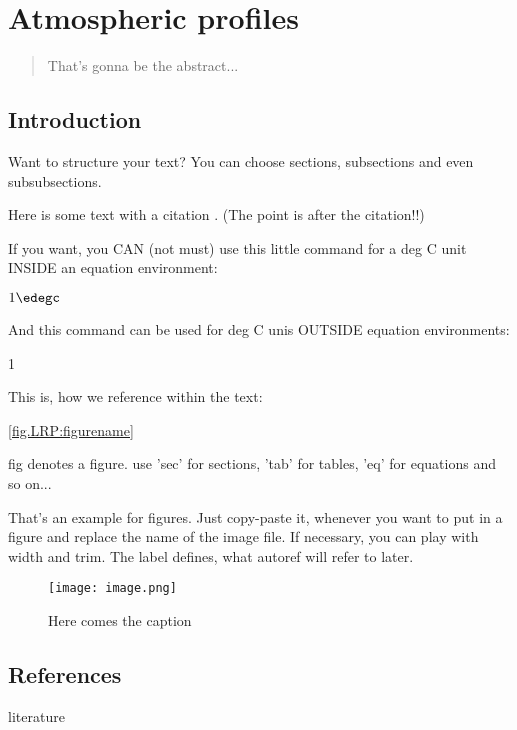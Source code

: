 

\renewcommand{\chapterauthor}{Again Your Name}
\chapter{Atmospheric profiles}
\label{student1:report}

\begin{abstract}

That's gonna be the abstract...

\end{abstract}


\section{Introduction}

Want to structure your text? You can choose sections, subsections and even subsubsections.

Here is some text  with a citation \citet{ref1to1bibfile}. (The point is after the citation!!)

If you want, you CAN (not must) use this little command for a deg C unit INSIDE an equation environment:

$1 \edegc$

And this command can be used for deg C unis OUTSIDE equation environments:

1 \degc

This is, how we reference within the text:

\autoref{fig.LRP:figurename}

fig denotes a figure. use 'sec' for sections, 'tab' for tables, 'eq' for equations and so on...

That's an example for figures. Just copy-paste it, whenever you want to put in a figure and replace the name of the image file. If necessary, you can play with width and trim. The label defines, what autoref will refer to later.

\begin{figure}[h]
\centering
\texttt{[image: image.png]}
\caption{Here comes the caption}
\label{fig.LRP:figurename}
\end{figure}


\section*{References}
\begin{btSect}{literature}
\btPrintAll
\end{btSect}
